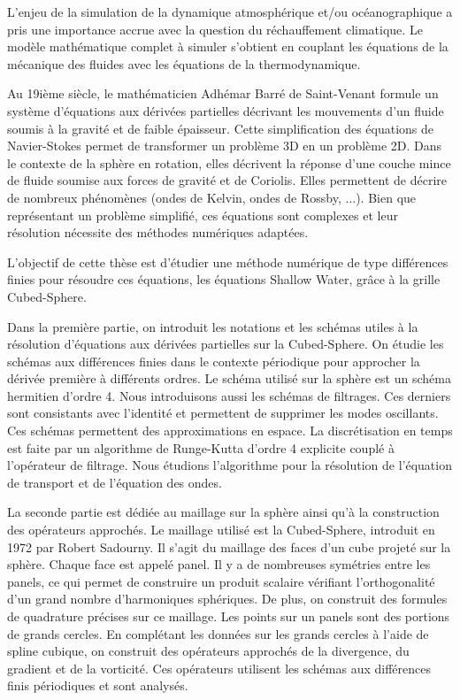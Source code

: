  \begin{FrenchAbstract}
L'enjeu de la simulation de la dynamique atmosphérique et/ou océanographique a pris une importance accrue avec la question du réchauffement climatique.
Le modèle mathématique complet à simuler s'obtient en couplant les équations de la mécanique des fluides avec les équations de la thermodynamique.

Au 19ième siècle, le mathématicien Adhémar Barré de Saint-Venant formule un système d'équations aux dérivées partielles décrivant les mouvements d'un fluide soumis à la gravité et de faible épaisseur. Cette simplification des équations de Navier-Stokes permet de transformer un problème 3D en un problème 2D. Dans le contexte de la sphère en rotation, elles décrivent la réponse d'une couche mince de fluide soumise aux forces de gravité et de Coriolis. Elles permettent de décrire de nombreux phénomènes (ondes de Kelvin, ondes de Rossby, ...). Bien que représentant un problème simplifié, ces équations sont complexes et leur résolution nécessite des méthodes numériques adaptées.

L'objectif de cette thèse est d'étudier une méthode numérique de type différences finies pour résoudre ces équations, les équations Shallow Water, grâce à la grille Cubed-Sphere.

Dans la première partie, on introduit les notations et les schémas utiles à la résolution d'équations aux dérivées partielles sur la Cubed-Sphere. On étudie les schémas aux différences finies dans le contexte périodique pour approcher la dérivée première à différents ordres. Le schéma utilisé sur la sphère est un schéma hermitien d'ordre 4. Nous introduisons aussi les schémas de filtrages. Ces derniers sont consistants avec l'identité et permettent de supprimer les modes oscillants. Ces schémas permettent des approximations en espace. La discrétisation en temps est faite par un algorithme de Runge-Kutta d'ordre 4 explicite couplé à l'opérateur de filtrage. Nous étudions l'algorithme pour la résolution de l'équation de transport et de l'équation des ondes. 

La seconde partie est dédiée au maillage sur la sphère ainsi qu'à la construction des opérateurs approchés. Le maillage utilisé est la Cubed-Sphere, introduit en 1972 par Robert Sadourny. Il s'agit du maillage des faces d'un cube projeté sur la sphère. Chaque face est appelé panel. Il y a de nombreuses symétries entre les panels, ce qui permet de construire un produit scalaire vérifiant l'orthogonalité d'un grand nombre d'harmoniques sphériques. De plus, on construit des formules de quadrature précises sur ce maillage. Les points sur un panels sont des portions de grands cercles. En complétant les données sur les grands cercles à l'aide de spline cubique, on construit des opérateurs approchés de la divergence, du gradient et de la vorticité. Ces opérateurs utilisent les schémas aux différences finis périodiques et sont analysés.


\end{FrenchAbstract}
